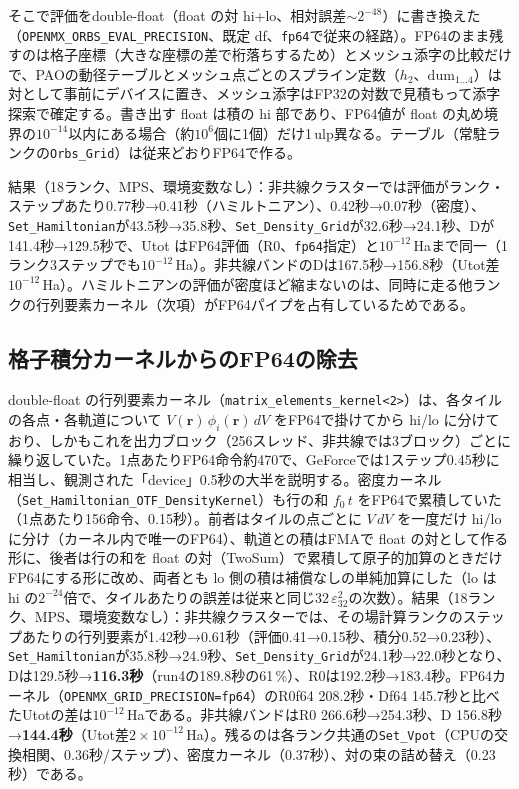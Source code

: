 \documentclass[a4paper,11pt]{ltjsarticle}
\newcommand{\code}[1]{\texttt{#1}}
\begin{document}
そこで評価をdouble-float（float の対 hi+lo、相対誤差$\sim2^{-48}$）に書き換えた（\code{OPENMX\_ORBS\_EVAL\_PRECISION}、既定 df、\code{fp64}で従来の経路）。FP64のまま残すのは格子座標（大きな座標の差で桁落ちするため）とメッシュ添字の比較だけで、PAOの動径テーブルとメッシュ点ごとのスプライン定数（$h_2$、$\mathrm{dum}_{1\ldots4}$）は対として事前にデバイスに置き、メッシュ添字はFP32の対数で見積もって添字探索で確定する。書き出す float は積の hi 部であり、FP64値が float の丸め境界の$10^{-14}$以内にある場合（約$10^6$個に1個）だけ1\,ulp異なる。テーブル（常駐ランクの\code{Orbs\_Grid}）は従来どおりFP64で作る。

結果（18ランク、MPS、環境変数なし）：非共線クラスターでは評価がランク・ステップあたり0.77秒→0.41秒（ハミルトニアン）、0.42秒→0.07秒（密度）、\code{Set\_Hamiltonian}が43.5秒→35.8秒、\code{Set\_Density\_Grid}が32.6秒→24.1秒、Dが141.4秒→129.5秒で、Utot はFP64評価（R0、\code{fp64}指定）と$10^{-12}$\,Haまで同一（1ランク3ステップでも$10^{-12}$\,Ha）。非共線バンドのDは167.5秒→156.8秒（Utot差$10^{-12}$\,Ha）。ハミルトニアンの評価が密度ほど縮まないのは、同時に走る他ランクの行列要素カーネル（次項）がFP64パイプを占有しているためである。

\subsection{格子積分カーネルからのFP64の除去}
double-float の行列要素カーネル（\code{matrix\_elements\_kernel<2>}）は、各タイルの各点・各軌道について $V(\mathbf r)\,\phi_i(\mathbf r)\,dV$ をFP64で掛けてから hi/lo に分けており、しかもこれを出力ブロック（256スレッド、非共線では3ブロック）ごとに繰り返していた。1点あたりFP64命令約470で、GeForceでは1ステップ0.45秒に相当し、観測された「device」0.5秒の大半を説明する。密度カーネル（\code{Set\_Hamiltonian\_OTF\_DensityKernel}）も行の和 $f_0\,t$ をFP64で累積していた（1点あたり156命令、0.15秒）。前者はタイルの点ごとに $V\,dV$ を一度だけ hi/lo に分け（カーネル内で唯一のFP64）、軌道との積はFMAで float の対として作る形に、後者は行の和を float の対（TwoSum）で累積して原子的加算のときだけFP64にする形に改め、両者とも lo 側の積は補償なしの単純加算にした（lo は hi の$2^{-24}$倍で、タイルあたりの誤差は従来と同じ$32\,\varepsilon_{32}^2$の次数）。結果（18ランク、MPS、環境変数なし）：非共線クラスターでは、その場計算ランクのステップあたりの行列要素が1.42秒→0.61秒（評価0.41→0.15秒、積分0.52→0.23秒）、\code{Set\_Hamiltonian}が35.8秒→24.9秒、\code{Set\_Density\_Grid}が24.1秒→22.0秒となり、Dは129.5秒→\textbf{116.3秒}（run4の189.8秒の61\,\%）、R0は192.2秒→183.4秒。FP64カーネル（\code{OPENMX\_GRID\_PRECISION=fp64}）のR0f64 208.2秒・Df64 145.7秒と比べたUtotの差は$10^{-12}$\,Haである。非共線バンドはR0 266.6秒→254.3秒、D 156.8秒→\textbf{144.4秒}（Utot差$2\times10^{-12}$\,Ha）。残るのは各ランク共通の\code{Set\_Vpot}（CPUの交換相関、0.36秒/ステップ）、密度カーネル（0.37秒）、対の束の詰め替え（0.23秒）である。
\end{document}
